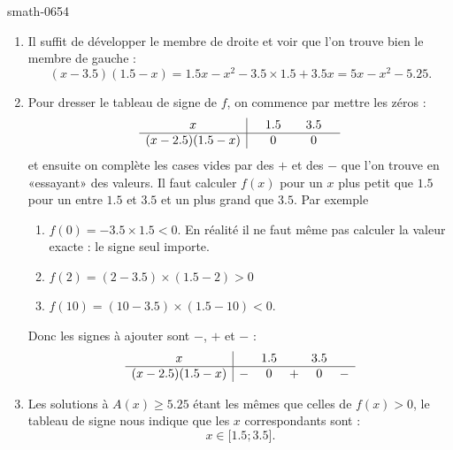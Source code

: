 \begin{corrige}{smath-0654}
\begin{enumerate}
            \begin{enumerate}
                \item
                    Il suffit de développer le membre de droite et voir que l'on trouve bien le membre de gauche :
                    \begin{equation}
                        (x-3.5)(1.5-x)=1.5x-x^2-3.5\times 1.5+3.5x=5x-x^2-5.25.
                    \end{equation}
                \item
                    Pour dresser le tableau de signe de \( f\), on commence par mettre les zéros :
                    \begin{equation*}
                        \begin{array}[]{c|ccccc}
                             x&&1.5&&3.5&\\
                              \hline
                              (x-2.5)(1.5-x)&&0&&0&\\ 
                               \end{array}
                           \end{equation*}
                    et ensuite on complète les cases vides par des \( +\) et des \( -\) que l'on trouve en «essayant» des valeurs. Il faut calculer \( f(x)\) pour un \( x\) plus petit que \( 1.5\) pour un entre \( 1.5\) et \( 3.5\) et un plus grand que \( 3.5\). Par exemple
                    \begin{enumerate}
                        \item
                            \( f(0)=-3.5\times 1.5<0\). En réalité il ne faut même pas calculer la valeur exacte : le signe seul importe.
                        \item
                            \( f(2)=(2-3.5)\times (1.5-2)>0\)
                        \item
                            \( f(10)=(10-3.5)\times (1.5-10)<0\).
                    \end{enumerate}
                    Donc les signes à ajouter sont \( -\), \( +\) et \( -\) :
                    \begin{equation*}
                        \begin{array}[]{c|ccccc}
                             x&&1.5&&3.5&\\
                              \hline
                              (x-2.5)(1.5-x)&-&0&+&0&-\\ 
                               \end{array}
                           \end{equation*}
                       \item
                           Les solutions à \( A(x)\geq 5.25\) étant les mêmes que celles de \( f(x)>0\), le tableau de signe nous indique que les \( x\) correspondants sont :
                           \begin{equation}
                               x\in\mathopen[ 1.5 ;3.5 \mathclose].
                           \end{equation}
                           

\end{enumerate}
\end{enumerate}
\end{corrige}

